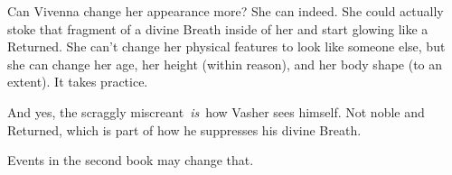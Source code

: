 Can Vivenna change her appearance more? She can indeed. She could actually stoke that fragment of a divine Breath inside of her and start glowing like a Returned. She can’t change her physical features to look like someone else, but she can change her age, her height (within reason), and her body shape (to an extent). It takes practice.

And yes, the scraggly miscreant~\textit{is}~how Vasher sees himself. Not noble and Returned, which is part of how he suppresses his divine Breath.

Events in the second book may change that.

